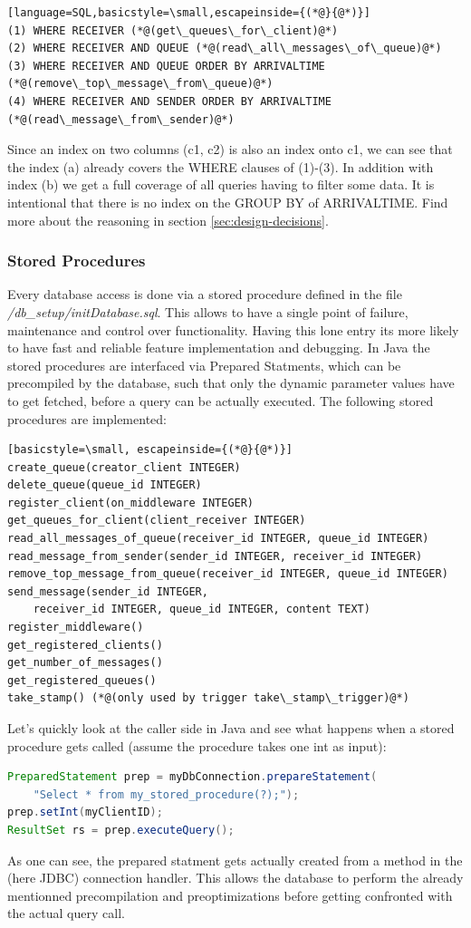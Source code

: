 \documentclass[11pt]{article}
\begin{document}
\begin{lstlisting}[language=SQL,basicstyle=\small,escapeinside={(*@}{@*)}]
(1) WHERE RECEIVER (*@(get\_queues\_for\_client)@*)
(2) WHERE RECEIVER AND QUEUE (*@(read\_all\_messages\_of\_queue)@*)
(3) WHERE RECEIVER AND QUEUE ORDER BY ARRIVALTIME (*@(remove\_top\_message\_from\_queue)@*)
(4) WHERE RECEIVER AND SENDER ORDER BY ARRIVALTIME (*@(read\_message\_from\_sender)@*)
\end{lstlisting}
Since an index on two columns (c1, c2) is also an index onto c1, we can see that the index (a) already covers the WHERE clauses of (1)-(3). In addition with index (b) we get a full coverage of all queries having to filter some data. It is intentional that there is no index on the GROUP BY of ARRIVALTIME. Find more about the reasoning in section \ref{sec:design-decisions}.

\subsubsection{Stored Procedures}\label{sec:stored-procedures}
Every database access is done via a stored procedure defined in the file \textit{/db\_setup/initDatabase.sql}. This allows to have a single point of failure, maintenance and control over functionality. Having this lone entry its more likely to have fast and reliable feature implementation and debugging. In Java the stored procedures are interfaced via Prepared Statments, which can be precompiled by the database, such that only the dynamic parameter values have to get fetched, before a query can be actually executed. The following stored procedures are implemented:
\begin{lstlisting}[basicstyle=\small, escapeinside={(*@}{@*)}]
create_queue(creator_client INTEGER)
delete_queue(queue_id INTEGER)
register_client(on_middleware INTEGER)
get_queues_for_client(client_receiver INTEGER)
read_all_messages_of_queue(receiver_id INTEGER, queue_id INTEGER)
read_message_from_sender(sender_id INTEGER, receiver_id INTEGER)
remove_top_message_from_queue(receiver_id INTEGER, queue_id INTEGER)
send_message(sender_id INTEGER,
	receiver_id INTEGER, queue_id INTEGER, content TEXT)
register_middleware()
get_registered_clients()
get_number_of_messages()
get_registered_queues()
take_stamp() (*@(only used by trigger take\_stamp\_trigger)@*)
\end{lstlisting}
Let's quickly look at the caller side in Java and see what happens when a stored procedure gets called (assume the procedure takes one int as input):
\begin{lstlisting}[basicstyle=\small, language=Java, showstringspaces=false]
PreparedStatement prep = myDbConnection.prepareStatement(
	"Select * from my_stored_procedure(?);");
prep.setInt(myClientID);
ResultSet rs = prep.executeQuery();
\end{lstlisting}
As one can see, the prepared statment gets actually created from a method in the (here JDBC) connection handler. This allows the database to perform the already mentionned precompilation and preoptimizations before getting confronted with the actual query call.
\end{document}
